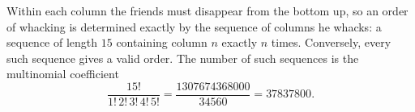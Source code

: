 Within each column the friends must disappear from the bottom up, so an order of whacking is determined exactly by the sequence of columns he whacks: a sequence of length $15$ containing column $n$ exactly $n$ times. Conversely, every such sequence gives a valid order. The number of such sequences is the multinomial coefficient
\[\dfrac{15!}{1!\,2!\,3!\,4!\,5!}=\dfrac{1307674368000}{34560}=\boxed{37837800}.\]
